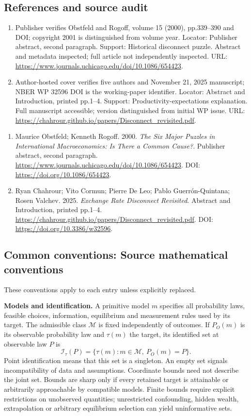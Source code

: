 \documentclass[11pt,a4paper]{article}
\begin{document}
\subsection*{References and source audit}
\begin{enumerate}
\item Publisher verifies Obstfeld and Rogoff, volume 15 (2000), pp.339--390 and DOI; copyright 2001 is distinguished from volume year. Locator: Publisher abstract, second paragraph. Support: Historical disconnect puzzle. Abstract and metadata inspected; full article not independently inspected. URL: \url{https://www.journals.uchicago.edu/doi/10.1086/654423}.
\item Author-hosted cover verifies five authors and November 21, 2025 manuscript; NBER WP 32596 DOI is the working-paper identifier. Locator: Abstract and Introduction, printed pp.1--4. Support: Productivity-expectations explanation. Full manuscript accessible; version distinguished from initial WP issue. URL: \url{https://chahrour.github.io/papers/Disconnect_revisited.pdf}.
\end{enumerate}
\begin{enumerate}\raggedright
\item\hypertarget{definitions:source:30007613:1}{} Maurice Obstfeld; Kenneth Rogoff. 2000. \emph{The Six Major Puzzles in International Macroeconomics: Is There a Common Cause?}. Publisher abstract, second paragraph.
\url{https://www.journals.uchicago.edu/doi/10.1086/654423}.
DOI: \url{https://doi.org/10.1086/654423}.
\item\hypertarget{definitions:source:30007613:2}{} Ryan Chahrour; Vito Cormun; Pierre De Leo; Pablo Guerrón-Quintana; Rosen Valchev. 2025. \emph{Exchange Rate Disconnect Revisited}. Abstract and Introduction, printed pp.1--4.
\url{https://chahrour.github.io/papers/Disconnect_revisited.pdf}.
DOI: \url{https://doi.org/10.3386/w32596}.
\end{enumerate}

\subsection*{Common conventions: Source mathematical conventions}

These conventions apply to each entry unless explicitly replaced.

\textbf{Models and identification.} A primitive model \(m\) specifies all probability laws, feasible choices, information, equilibrium and measurement rules used by its target. The admissible class \(\mathcal M\) is fixed independently of outcomes. If \(P_O(m)\) is its observable probability law and \(\tau(m)\) the target, its identified set at observable law \(P\) is
\[
 \mathcal I_\tau(P)=\{\tau(m):m\in\mathcal M,\ P_O(m)=P\}.
\]
Point identification means that this set is a singleton. An empty set signals incompatibility of data and assumptions. Coordinate bounds need not describe the joint set. Bounds are sharp only if every retained target is attainable or arbitrarily approachable by compatible models. Finite bounds require explicit restrictions on unobserved quantities; unrestricted confounding, hidden wealth, extrapolation or arbitrary equilibrium selection can yield uninformative sets.
\end{document}
